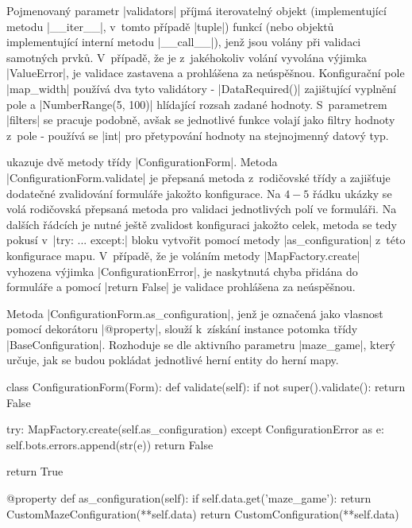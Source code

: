 \begin{sloppypar}
    Pojmenovaný parametr \ic|validators| příjmá iterovatelný objekt (implementující metodu \ic|__iter__|, v~tomto případě \ic|tuple|) funkcí (nebo objektů implementující interní metodu \ic|__call__|), jenž jsou volány při validaci samotných prvků. V~případě, že je z~jakéhokoliv volání vyvolána výjimka \ic|ValueError|, je validace zastavena a prohlášena za neúspěšnou. Konfigurační pole \ic|map_width| používá dva tyto validátory - \ic|DataRequired()| zajištující vyplnění pole a \ic|NumberRange(5, 100)| hlídající rozsah zadané hodnoty. S~parametrem \ic|filters| se pracuje podobně, avšak se jednotlivé funkce volají jako filtry hodnoty z~pole - používá se \ic|int| pro přetypování hodnoty na stejnojmenný datový typ.

     ukazuje dvě metody třídy \ic|ConfigurationForm|. Metoda \ic|ConfigurationForm.validate| je přepsaná metoda z~rodičovské třídy a zajišťuje dodatečné zvalidování formuláře jakožto konfigurace. Na $4-5$ řádku ukázky se volá rodičovská přepsaná metoda pro validaci jednotlivých polí ve formuláři. Na dalších řádcích je nutné ještě zvalidost konfiguraci jakožto celek, metoda se tedy pokusí v~\ic|try: ... except:| bloku vytvořit pomocí metody \ic|as_configuration| z~této konfigurace mapu. V~případě, že je voláním metody \ic|MapFactory.create| vyhozena výjimka \ic|ConfigurationError|, je naskytnutá chyba přidána do formuláře a pomocí \ic|return False| je validace prohlášena za neúspěšnou. 

    Metoda \ic|ConfigurationForm.as_configuration|, jenž je označená jako vlasnost pomocí dekorátoru \ic|@property|, slouží k~získání instance potomka třídy \ic|BaseConfiguration|. Rozhoduje se dle aktivního parametru \ic|maze_game|, který určuje, jak se budou pokládat jednotlivé herní entity do herní mapy.
\end{sloppypar}

\begin{code}[caption={Implementace vlastních metod v~$ConfigurationForm$},label={lst:conf-form-methods}]
class ConfigurationForm(Form):
    def validate(self):
        if not super().validate():
            return False

        try:
            MapFactory.create(self.as_configuration)
        except ConfigurationError as e:
            self.bots.errors.append(str(e))
            return False

        return True

    @property
    def as_configuration(self):
        if self.data.get('maze_game'):
            return CustomMazeConfiguration(**self.data)
        return CustomConfiguration(**self.data)
\end{code}
